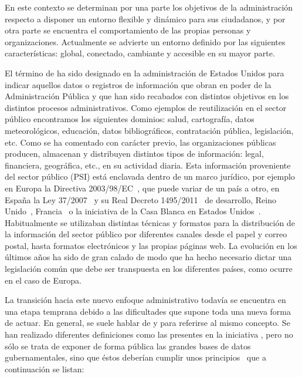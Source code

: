 En este contexto se determinan por una parte los objetivos de la administración
respecto a disponer un entorno flexible y dinámico para sus ciudadanos, y por otra parte 
se encuentra el comportamiento de las propias personas y organizaciones. Actualmente
se advierte un entorno definido por las siguientes características: 
global, conectado, cambiante y accesible en su mayor parte.

El término de \ogd ha sido designado en la administración de Estados Unidos para indicar
aquellos datos o registros de información que obran en poder de la Administración Pública y que
han sido recabados con distintos objetivos en los distintos procesos administrativos. Como ejemplos
de reutilización en el sector público encontramos los siguientes dominios: salud, cartografía, datos
meteorológicos, educación, datos bibliográficos, contratación pública, legislación, etc. Como 
se ha comentado con carácter previo, las organizaciones públicas producen, almacenan y distribuyen distintos tipos
de información: legal, financiera, geográfica, etc., en su actividad diaria. Esta información
proveniente del sector público (\gls{PSI}) está enclavada dentro de un marco jurídico, por ejemplo en Europa la Directiva 2003/98/EC~\cite{d2003,d2003-update},
 que puede variar de un país a otro, en España la Ley 37/2007~\cite{l37-2007} y su Real Decreto 1495/2011~\cite{r-1495} 
de desarrollo, Reino Unido~\cite{uk2012}, Francia~\cite{fr2012} o la iniciativa de la Casa Blanca en Estados Unidos~\cite{usa}. 
Habitualmente se utilizaban distintas técnicas y formatos
para la distribución de la información del sector público por diferentes canales desde el papel y correo postal, hasta
formatos electrónicos y las propias páginas web. La evolución en los últimos
años ha sido de gran calado de modo que ha hecho necesario dictar una legislación común que 
debe ser transpuesta en los diferentes países, como ocurre en el caso de Europa.

La transición hacia este nuevo enfoque administrativo todavía se encuentra
en una etapa temprana debido a las dificultades que supone toda una nueva forma de
actuar. En general, se suele hablar de \gd y \pusi para referirse al mismo concepto. Se han realizado diferentes definiciones como las
presentes en la iniciativa \ogd, pero no sólo se trata de exponer de forma pública 
las grandes bases de datos gubernamentales, sino que éstos deberían cumplir 
unos principios~\cite{8-principles} que a continuación se listan:

